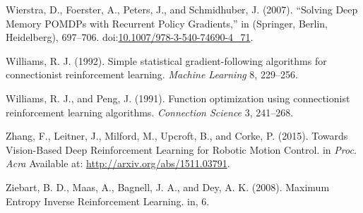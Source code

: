 \documentclass[
  letterpaper,
  DIV=11,
  numbers=noendperiod]{scrreprt}
\newlength{\cslhangindent}
\newlength{\cslentryspacingunit} %
\newenvironment{CSLReferences}[2] %
 {%
  \setlength{\parindent}{0pt}
  \ifodd #1
  \let\oldpar\par
  \def\par{\hangindent=\cslhangindent\oldpar}
  \fi
  \setlength{\parskip}{#2\cslentryspacingunit}
 }%
 {}
\begin{document}
\begin{CSLReferences}{1}{0}
\leavevmode{}%
Wierstra, D., Foerster, A., Peters, J., and Schmidhuber, J. (2007).
{``Solving {Deep Memory POMDPs} with {Recurrent Policy Gradients},''} in
({Springer, Berlin, Heidelberg}), 697--706.
doi:\href{https://doi.org/10.1007/978-3-540-74690-4_71}{10.1007/978-3-540-74690-4\_71}.

\leavevmode{}%
Williams, R. J. (1992). Simple statistical gradient-following algorithms
for connectionist reinforcement learning. \emph{Machine Learning} 8,
229--256.

\leavevmode{}%
Williams, R. J., and Peng, J. (1991). Function optimization using
connectionist reinforcement learning algorithms. \emph{Connection
Science} 3, 241--268.

\leavevmode{}%
Zhang, F., Leitner, J., Milford, M., Upcroft, B., and Corke, P. (2015).
Towards {Vision-Based Deep Reinforcement Learning} for {Robotic Motion
Control}. in \emph{Proc. {Acra}} Available at:
\url{http://arxiv.org/abs/1511.03791}.

\leavevmode{}%
Ziebart, B. D., Maas, A., Bagnell, J. A., and Dey, A. K. (2008). Maximum
{Entropy Inverse Reinforcement Learning}. in, 6.

\end{CSLReferences}
\end{document}

